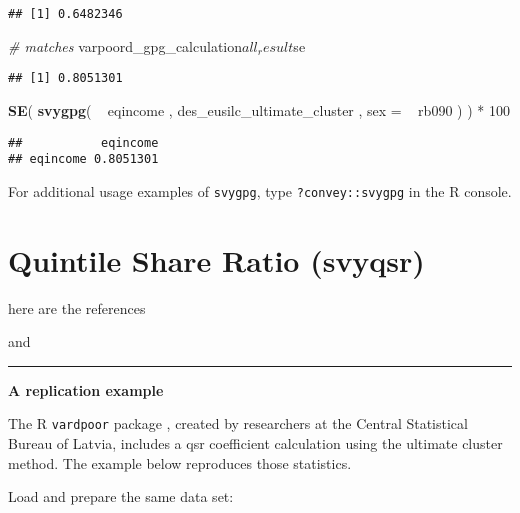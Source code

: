 \documentclass[]{book}
\newenvironment{Shaded}{\begin{snugshade}}{\end{snugshade}}
\newcommand{\KeywordTok}[1]{\textcolor[rgb]{0.13,0.29,0.53}{\textbf{{#1}}}}
\newcommand{\DataTypeTok}[1]{\textcolor[rgb]{0.13,0.29,0.53}{{#1}}}
\newcommand{\DecValTok}[1]{\textcolor[rgb]{0.00,0.00,0.81}{{#1}}}
\newcommand{\StringTok}[1]{\textcolor[rgb]{0.31,0.60,0.02}{{#1}}}
\newcommand{\CommentTok}[1]{\textcolor[rgb]{0.56,0.35,0.01}{\textit{{#1}}}}
\newcommand{\NormalTok}[1]{{#1}}
\theoremstyle{definition}
\theoremstyle{definition}
\theoremstyle{remark}
\begin{document}
\begin{verbatim}
## [1] 0.6482346
\end{verbatim}

\begin{Shaded}
\begin{Highlighting}[]
\CommentTok{# matches}
\NormalTok{varpoord_gpg_calculation$all_result$se}
\end{Highlighting}
\end{Shaded}

\begin{verbatim}
## [1] 0.8051301
\end{verbatim}

\begin{Shaded}
\begin{Highlighting}[]
\KeywordTok{SE}\NormalTok{( }\KeywordTok{svygpg}\NormalTok{( ~}\StringTok{ }\NormalTok{eqincome , des_eusilc_ultimate_cluster , }\DataTypeTok{sex =} \NormalTok{~}\StringTok{ }\NormalTok{rb090 ) ) *}\StringTok{ }\DecValTok{100}
\end{Highlighting}
\end{Shaded}

\begin{verbatim}
##           eqincome
## eqincome 0.8051301
\end{verbatim}

For additional usage examples of \texttt{svygpg}, type
\texttt{?convey::svygpg} in the R console.

\section{Quintile Share Ratio
(svyqsr)}\label{quintile-share-ratio-svyqsr}

here are the references

\citep{osier2009} and \citep{deville1999}

\begin{center}\rule{0.5\linewidth}{\linethickness}\end{center}

\textbf{A replication example}

The R \texttt{vardpoor} package \citep{vardpoor}, created by researchers
at the Central Statistical Bureau of Latvia, includes a qsr coefficient
calculation using the ultimate cluster method. The example below
reproduces those statistics.

Load and prepare the same data set:
\end{document}
